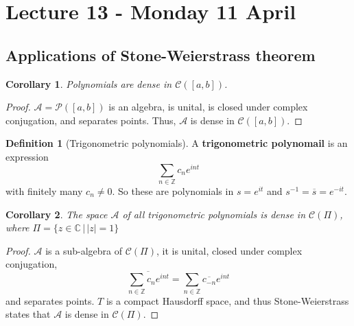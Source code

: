 \documentclass[10pt, oneside, reqno]{amsart}
\theoremstyle{plain}%
\newtheorem*{cor}{Corollary}
\theoremstyle{definition}
\newtheorem{defn}[thm]{Definition}
\theoremstyle{remark}
\newcommand{\Com}{\mathbb{C}}
\newcommand{\Z}{\mathbb{Z}}
\begin{document}

\section{Lecture 13 - Monday 11 April} %
\label{sec:lecture_13_monday_11_april}

\subsection{Applications of Stone-Weierstrass theorem} %
\label{sub:applications_of_stone_weierstrass_theorem}
\begin{cor}
    Polynomials are dense in $\mathcal C([a,b])$.  
\end{cor}
\begin{proof}
    $\mathcal A = \mathcal P([a,b])$ is an algebra, is unital, is closed under complex conjugation, and separates points.  Thus, $\mathcal A$ is dense in $\mathcal C([a,b])$.
\end{proof}

\begin{defn}[Trigonometric polynomials]
    A \textbf{trigonometric polynomail} is an expression \[
        \sum_{ n \in \Z} c_n e^{i n t}
    \] with finitely many $c_n \neq 0$. So these are polynomials in $s = e^{it}$ and $s^{-1} = \overline s = e^{-it}$.
\end{defn}

\begin{cor}
    The space $\mathcal A$ of all trigonometric polynomials is dense in $\mathcal C(\Pi)$, where $\Pi = \{ z \in \Com \, | \, |z | = 1 \}$
\end{cor}
\begin{proof}
    $\mathcal A$ is a sub-algebra of $\mathcal C(\Pi)$, it is unital, closed under complex conjugation, \[
        \overline{\sum_{n \in \Z} c_n e^{int}} = \sum_{n \in \Z} \overline{c_{-n}} e^{int}
    \] and separates points.  $T$ is a compact Hausdorff space, and thus Stone-Weierstrass states that $\mathcal{A}$ is dense in $\mathcal C(\Pi)$.  
\end{proof}
\end{document}
